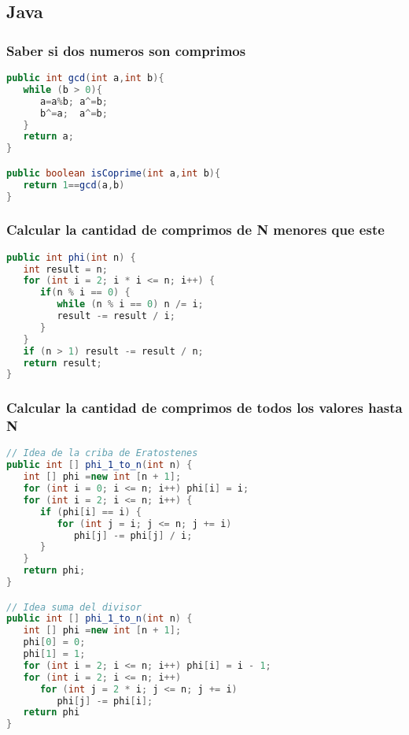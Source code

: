 \subsection{Java}

\subsubsection{Saber si dos numeros son comprimos}

\begin{lstlisting}[language=Java]
public int gcd(int a,int b){
   while (b > 0){
      a=a%b; a^=b; 
      b^=a;  a^=b; 
   } 
   return a;
}

public boolean isCoprime(int a,int b){
   return 1==gcd(a,b)
}
\end{lstlisting}

\subsubsection{Calcular la cantidad de comprimos de N menores que este}

\begin{lstlisting}[language=Java]
public int phi(int n) {
   int result = n;
   for (int i = 2; i * i <= n; i++) {
      if(n % i == 0) {
         while (n % i == 0) n /= i;
         result -= result / i;
      }
   }
   if (n > 1) result -= result / n;
   return result;
}
\end{lstlisting}

\subsubsection{Calcular la cantidad de comprimos de todos los valores hasta N}

\begin{lstlisting}[language=Java]
// Idea de la criba de Eratostenes
public int [] phi_1_to_n(int n) {
   int [] phi =new int [n + 1];
   for (int i = 0; i <= n; i++) phi[i] = i;
   for (int i = 2; i <= n; i++) {
      if (phi[i] == i) {
         for (int j = i; j <= n; j += i)
            phi[j] -= phi[j] / i;
      }
   }
   return phi;
}

// Idea suma del divisor
public int [] phi_1_to_n(int n) {
   int [] phi =new int [n + 1];
   phi[0] = 0;
   phi[1] = 1;
   for (int i = 2; i <= n; i++) phi[i] = i - 1;
   for (int i = 2; i <= n; i++)
      for (int j = 2 * i; j <= n; j += i)
         phi[j] -= phi[i];
   return phi
}
\end{lstlisting}